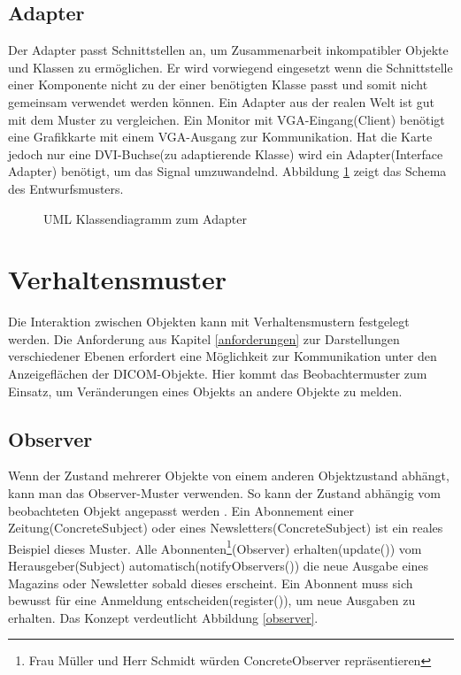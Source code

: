 \subsection{Adapter}
Der Adapter passt Schnittstellen an, um Zusammenarbeit inkompatibler Objekte und Klassen zu ermöglichen. Er wird vorwiegend eingesetzt wenn die Schnittstelle einer Komponente nicht zu der einer benötigten Klasse passt und somit nicht gemeinsam verwendet werden können\cite[5.1]{starke:swa}. Ein Adapter aus der realen Welt ist gut mit dem Muster zu vergleichen. Ein Monitor mit VGA-Eingang(Client) benötigt eine Grafikkarte mit einem VGA-Ausgang zur Kommunikation. Hat die Karte jedoch nur eine DVI-Buchse(zu adaptierende Klasse) wird ein Adapter(Interface Adapter) benötigt, um das Signal umzuwandelnd. Abbildung \ref{adapterpattern} zeigt das Schema des Entwurfsmusters.

\begin{figure}[htbp]
  \vspace{0.5cm}
  \centering
   \caption{UML Klassendiagramm zum Adapter}
  \label{adapterpattern}
  \vspace{0.5cm}
\end{figure}

\section{Verhaltensmuster}
Die Interaktion zwischen Objekten kann mit Verhaltensmustern festgelegt werden. Die Anforderung aus Kapitel \ref{anforderungen} zur Darstellungen verschiedener Ebenen erfordert eine Möglichkeit zur Kommunikation unter den Anzeigeflächen der DICOM-Objekte. Hier kommt das Beobachtermuster zum Einsatz, um Veränderungen eines Objekts an andere Objekte zu melden. 

\subsection{Observer}
Wenn der Zustand mehrerer Objekte von einem anderen Objektzustand abhängt, kann man das Observer-Muster verwenden. So kann der Zustand abhängig vom beobachteten Objekt angepasst werden \cite[4.7]{starke:swa}. Ein Abonnement einer Zeitung(ConcreteSubject) oder eines Newsletters(ConcreteSubject) ist ein reales Beispiel dieses Muster. Alle Abonnenten\footnote{Frau Müller und Herr Schmidt würden ConcreteObserver repräsentieren}(Observer) erhalten(update()) vom Herausgeber(Subject) automatisch(notifyObservers()) die neue Ausgabe eines Magazins oder Newsletter sobald dieses erscheint. Ein Abonnent muss sich bewusst für eine Anmeldung entscheiden(register()), um neue Ausgaben zu erhalten. Das Konzept verdeutlicht Abbildung \ref{observer}.

